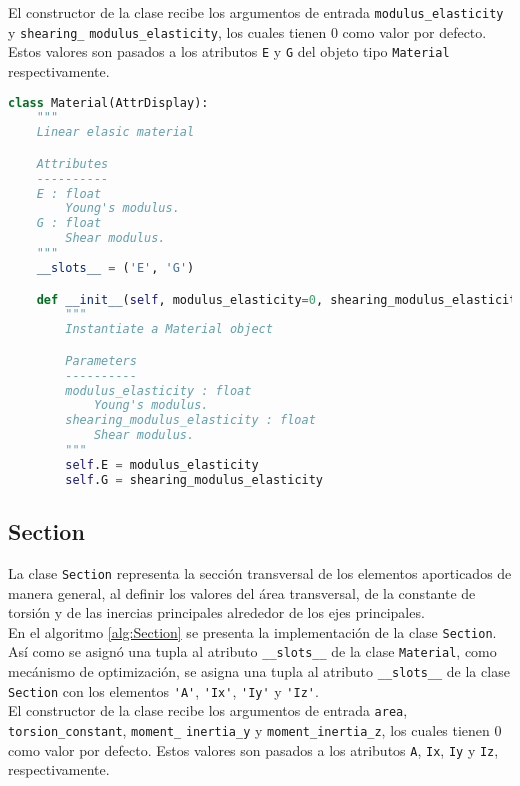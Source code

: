 El constructor de la clase recibe los argumentos de entrada \verb|modulus_elasticity| y \verb|shearing_| \verb|modulus_elasticity|, los cuales tienen $ 0 $ como valor por defecto. Estos valores son pasados a los atributos \verb|E| y \verb|G| del objeto tipo \verb|Material| respectivamente.\\

\begin{lstlisting}[language=Python,caption=Clase \texttt{Material} implementada en el archivo \texttt{primitives.py}.,label=alg:Material, frame=single]
class Material(AttrDisplay):
    """
    Linear elasic material

    Attributes
    ----------
    E : float
        Young's modulus.
    G : float
        Shear modulus.
    """
    __slots__ = ('E', 'G')

    def __init__(self, modulus_elasticity=0, shearing_modulus_elasticity=0):
        """
        Instantiate a Material object

        Parameters
        ----------
        modulus_elasticity : float
            Young's modulus.
        shearing_modulus_elasticity : float
            Shear modulus.
        """
        self.E = modulus_elasticity
        self.G = shearing_modulus_elasticity  
\end{lstlisting}
\bigskip
\subsection{Section}
La clase \verb|Section| representa la sección transversal de los elementos aporticados de manera general, al definir los valores del área transversal, de la constante de torsión y de las inercias principales alrededor de los ejes principales.\\

En el algoritmo \ref{alg:Section} se presenta la implementación de la clase \verb|Section|. Así como se asignó una tupla al atributo \verb|__slots__| de la clase \verb|Material|, como mecánismo de optimización, se asigna una tupla al atributo \verb|__slots__| de la clase \verb|Section| con los elementos \verb|'A'|, \verb|'Ix'|, \verb|'Iy'| y \verb|'Iz'|.\\

El constructor de la clase recibe los argumentos de entrada \verb|area|, \verb|torsion_constant|, \verb|moment_| \verb|inertia_y| y \verb|moment_inertia_z|, los cuales tienen $ 0 $ como valor por defecto. Estos valores son pasados a los atributos \verb|A|, \verb|Ix|, \verb|Iy| y \verb|Iz|, respectivamente.\\

